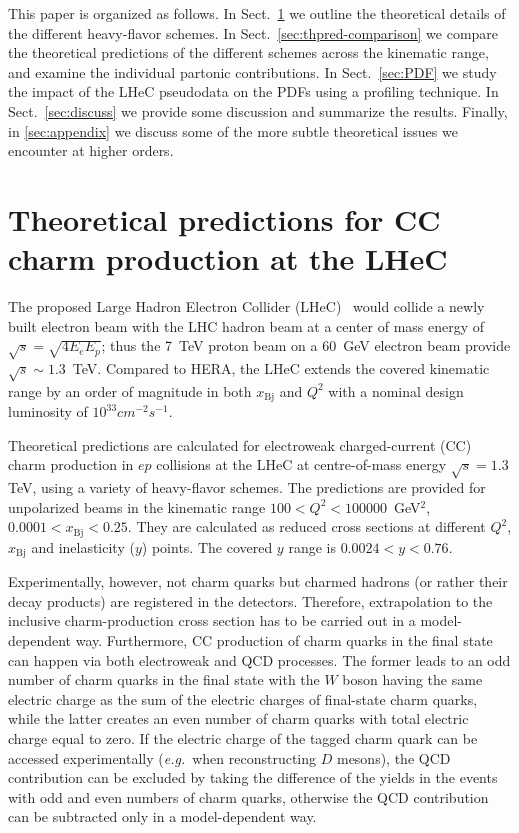 \documentclass[pdftex,twocolumn,epjc3]{svjour3}          %
\newcommand{\xbj}{\ensuremath{x_{\text{Bj}}}\xspace}
\begin{document}
This paper is organized as follows.
%
In Sect.~\ref{sec:thpred} we outline the theoretical details of the
different heavy-flavor schemes.
%
In Sect.~\ref{sec:thpred-comparison} we compare the theoretical
predictions of the different schemes across the kinematic range, and
examine the individual partonic contributions.
%
In Sect.~\ref{sec:PDF} we study the impact of the LHeC pseudodata on
the PDFs using a profiling technique.
%
In Sect.~\ref{sec:discuss} we provide some discussion and summarize the
results.
%
Finally, in \ref{sec:appendix} we discuss some of the more subtle
theoretical issues we encounter at higher orders.

\section{Theoretical predictions for CC charm production at the LHeC} \label{sec:thpred}

The proposed Large Hadron Electron Collider
(LHeC)~\cite{AbelleiraFernandez:2012cc} would collide a newly built
electron beam with the LHC hadron beam at a center of mass energy of
$\sqrt{s} = \sqrt{4 E_e E_p}$; thus the 7~TeV proton beam on a 60~GeV
electron beam provide $\sqrt{s}\sim 1.3$~TeV.
%
Compared to HERA, the LHeC extends the covered kinematic range by an
order of magnitude in both \xbj and $Q^2$ with a nominal design
luminosity of $10^{33} cm^{-2} s^{-1}$.


Theoretical predictions are calculated for electroweak charged-current
(CC) charm production in $ep$ collisions at the LHeC at centre-of-mass
energy $\sqrt{s} = 1.3$ TeV, using a variety of heavy-flavor
schemes. The predictions are provided for unpolarized beams in the
kinematic range $100 < Q^2 < 100000$~GeV$^2$, $0.0001 < \xbj < 0.25$.
They are calculated as reduced cross sections at different $Q^2$, \xbj
and inelasticity ($y$) points. 
The covered $y$ range is $0.0024 < y < 0.76$.

Experimentally, however, not charm quarks but charmed hadrons (or
rather their decay products) are registered in the detectors.
Therefore, extrapolation to the inclusive charm-production cross
section has to be carried out in a model-dependent way. Furthermore,
CC production of charm quarks in the final state can happen via both
electroweak and QCD processes.  The former leads to an odd number of
charm quarks in the final state with the $W$ boson having the same
electric charge as the sum of the electric charges of final-state
charm quarks, while the latter creates an even number of charm quarks
with total electric charge equal to zero. If the electric charge of
the tagged charm quark can be accessed experimentally
(\textit{e.g.}~when reconstructing $D$ mesons), the QCD contribution
can be excluded by taking the difference of the yields in the events
with odd and even numbers of charm quarks, otherwise the QCD
contribution can be subtracted only in a model-dependent way.
\end{document}
